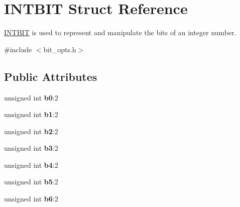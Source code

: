 \hypertarget{struct_i_n_t_b_i_t}{\section{I\-N\-T\-B\-I\-T Struct Reference}
\label{struct_i_n_t_b_i_t}
}


\hyperlink{struct_i_n_t_b_i_t}{I\-N\-T\-B\-I\-T} is used to represent and manipulate the bits of an integer number.  




{\ttfamily \#include $<$bit\-\_\-opts.\-h$>$}

\subsection*{Public Attributes}
\begin{DoxyCompactItemize}
\item 
\hypertarget{struct_i_n_t_b_i_t_a2475dfcf8399f880fa4cef72dba4e047}{unsigned int {\bfseries b0}\-:2}\label{struct_i_n_t_b_i_t_a2475dfcf8399f880fa4cef72dba4e047}

\item 
\hypertarget{struct_i_n_t_b_i_t_a107e2e328208555ebad0f192e00ee7fa}{unsigned int {\bfseries b1}\-:2}\label{struct_i_n_t_b_i_t_a107e2e328208555ebad0f192e00ee7fa}

\item 
\hypertarget{struct_i_n_t_b_i_t_aa86bda17fa4585e43759c29443b140e9}{unsigned int {\bfseries b2}\-:2}\label{struct_i_n_t_b_i_t_aa86bda17fa4585e43759c29443b140e9}

\item 
\hypertarget{struct_i_n_t_b_i_t_a156c1b274faa8dd27b926aa91f6158f9}{unsigned int {\bfseries b3}\-:2}\label{struct_i_n_t_b_i_t_a156c1b274faa8dd27b926aa91f6158f9}

\item 
\hypertarget{struct_i_n_t_b_i_t_a6554c39c34c8fc5390d86fe747bdc6c1}{unsigned int {\bfseries b4}\-:2}\label{struct_i_n_t_b_i_t_a6554c39c34c8fc5390d86fe747bdc6c1}

\item 
\hypertarget{struct_i_n_t_b_i_t_a5e1f273f225f58d7d9a671f6982c33bb}{unsigned int {\bfseries b5}\-:2}\label{struct_i_n_t_b_i_t_a5e1f273f225f58d7d9a671f6982c33bb}

\item 
\hypertarget{struct_i_n_t_b_i_t_acaa52dfcd0bc74ec89d4519263732b7b}{unsigned int {\bfseries b6}\-:2}\label{struct_i_n_t_b_i_t_acaa52dfcd0bc74ec89d4519263732b7b}


\end{DoxyCompactItemize}
